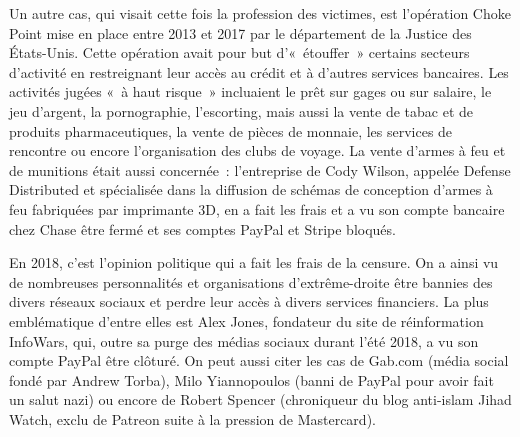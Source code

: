 Un autre cas, qui visait cette fois la profession des victimes, est l'opération Choke Point mise en place entre 2013 et 2017 par le département de la Justice des États-Unis. Cette opération avait pour but d'«~étouffer~» certains secteurs d'activité en restreignant leur accès au crédit et à d'autres services bancaires. Les activités jugées «~à haut risque~» incluaient le prêt sur gages ou sur salaire, le jeu d'argent, la pornographie, l'escorting, mais aussi la vente de tabac et de produits pharmaceutiques, la vente de pièces de monnaie, les services de rencontre ou encore l'organisation des clubs de voyage. La vente d'armes à feu et de munitions était aussi concernée~: l'entreprise de Cody Wilson, appelée Defense Distributed et spécialisée dans la diffusion de schémas de conception d'armes à feu fabriquées par imprimante 3D, en a fait les frais et a vu son compte bancaire chez Chase être fermé et ses comptes PayPal et Stripe bloqués.


En 2018, c'est l'opinion politique qui a fait les frais de la censure. On a ainsi vu de nombreuses personnalités et organisations d'extrême-droite être bannies des divers réseaux sociaux et perdre leur accès à divers services financiers. La plus emblématique d'entre elles est Alex Jones, fondateur du site de réinformation InfoWars, qui, outre sa purge des médias sociaux durant l'été 2018, a vu son compte PayPal être clôturé. On peut aussi citer les cas de Gab.com (média social fondé par Andrew Torba), Milo Yiannopoulos (banni de PayPal pour avoir fait un salut nazi) ou encore de Robert Spencer (chroniqueur du blog anti-islam Jihad Watch, exclu de Patreon suite à la pression de Mastercard).

